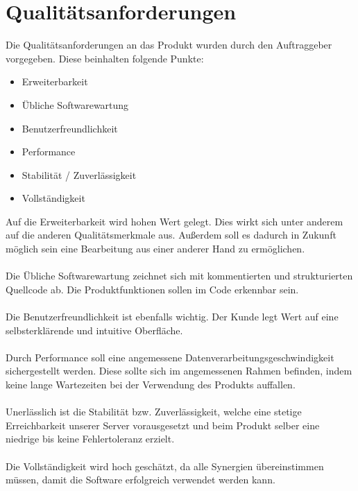 \section{Qualitätsanforderungen}
    Die Qualitätsanforderungen an das Produkt wurden durch den Auftraggeber vorgegeben. Diese beinhalten folgende Punkte:
    \begin{itemize}
        \item Erweiterbarkeit
        \item Übliche Softwarewartung
        \item Benutzerfreundlichkeit
        \item Performance
        \item Stabilität / Zuverlässigkeit
        \item Vollständigkeit
    \end{itemize}
%
    Auf die Erweiterbarkeit wird hohen Wert gelegt. Dies wirkt sich unter anderem auf die anderen Qualitätsmerkmale aus. Außerdem soll es dadurch in Zukunft möglich sein eine Bearbeitung aus einer anderer Hand zu ermöglichen.
    \\ \\
    Die Übliche Softwarewartung zeichnet sich mit kommentierten und strukturierten Quellcode ab. Die Produktfunktionen sollen im Code erkennbar sein.
    \\ \\
    Die Benutzerfreundlichkeit ist ebenfalls wichtig. Der Kunde legt Wert auf eine
    selbsterklärende und intuitive Oberfläche.
    \\ \\
    Durch Performance soll eine angemessene Datenverarbeitungsgeschwindigkeit sichergestellt werden. Diese sollte sich im angemessenen Rahmen befinden, indem keine lange Wartezeiten bei der Verwendung des Produkts auffallen.
    \\ \\
    Unerlässlich ist die Stabilität bzw. Zuverlässigkeit, welche eine stetige Erreichbarkeit unserer Server vorausgesetzt und beim Produkt selber eine niedrige bis keine Fehlertoleranz erzielt.
    \\ \\
    Die Vollständigkeit wird hoch geschätzt, da alle Synergien übereinstimmen müssen, damit die Software erfolgreich verwendet werden kann.
